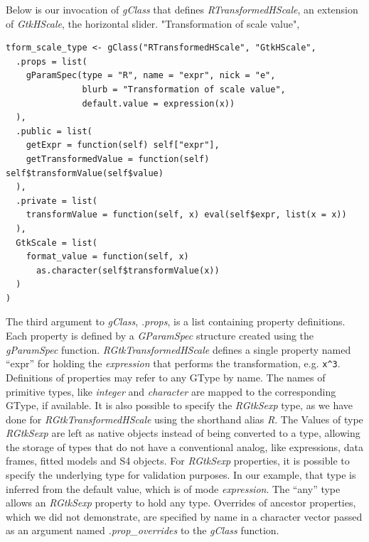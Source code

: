 \documentclass[article]{jss}
\begin{document}
Below is our invocation of \emph{gClass} that
defines \emph{RTransformedHScale}, an extension of \emph{GtkHScale},
the horizontal slider.
"Transformation of scale value",
% 
%

\begin{verbatim}
tform_scale_type <- gClass("RTransformedHScale", "GtkHScale",
  .props = list(
    gParamSpec(type = "R", name = "expr", nick = "e", 
               blurb = "Transformation of scale value",                 
               default.value = expression(x))
  ),
  .public = list(
    getExpr = function(self) self["expr"],
    getTransformedValue = function(self)
self$transformValue(self$value)
  ),
  .private = list(
    transformValue = function(self, x) eval(self$expr, list(x = x))
  ),
  GtkScale = list(
    format_value = function(self, x)
      as.character(self$transformValue(x))
  )
)
\end{verbatim}

The third argument to \emph{gClass}, \emph{.props}, is a list containing property definitions.
Each property is defined by a \emph{GParamSpec} structure created
using the 
\emph{gParamSpec} function. \emph{RGtkTransformedHScale} defines a
single 
property named ``expr'' for holding the  \emph{expression}
that 
performs the transformation, e.g. \verb+x^3+. Definitions of
properties may refer to any GType by name. 
The names of primitive  types, like \emph{integer} and
\emph{character} 
are mapped to the corresponding GType, if available. It is also
possible to specify the 
\emph{RGtkSexp} type, as we have done for
\emph{RGtkTransformedHScale} using the shorthand alias \emph{R}.  The
Values of type \emph{RGtkSexp} are left
as native  objects instead of being converted to a
 type, allowing the storage of  types that do
not have a conventional  analog, like expressions, data
frames, fitted models and S4 objects. For \emph{RGtkSexp} properties,
it is possible to specify the underlying  type for
validation purposes. In our example, that type is inferred from the
default value, which is of mode \emph{expression}.  The ``any'' type
allows an \emph{RGtkSexp} property to hold any  type.
Overrides of ancestor properties, which we did not demonstrate, are
specified by name in a character vector passed as an argument named
\emph{.prop\_overrides} to the \emph{gClass} function.
\end{document}

